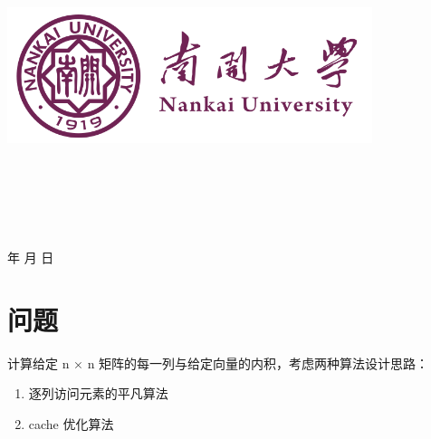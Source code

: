 \documentclass[a4paper]{article}
\newcommand{\HRule}{\rule{\linewidth}{0.5mm}}%
\begin{document}
\renewcommand{\contentsname}{目\ 录}
\renewcommand{\appendixname}{附录}
\renewcommand{\appendixpagename}{附录}
\renewcommand{\refname}{参考文献}
\renewcommand{\figurename}{图}
\renewcommand{\tablename}{表}
\renewcommand{\today}{\number\year 年 \number\month 月 \number\day 日}

\begin{titlepage}
  \begin{center}
    \includegraphics[width=0.8\textwidth]{NKU.png}\\[1cm]
    \vspace{20mm}
    \textbf{\huge\textbf{}}\\[0.5cm]
    \textbf{\huge{}}\\[2.3cm]
    \textbf{\Huge\textbf{}}

    \vspace{\fill}

    \centering
    \textsc{\LARGE {}}\\[0.5cm]
    \textsc{\LARGE {}}\\[0.5cm]
    \textsc{\LARGE {}}\\[0.5cm]

    \vfill
    {\Large \today}
  \end{center}
\end{titlepage}

\renewcommand {\thefigure}{\thesection{}.\arabic{figure}}%
\renewcommand{\figurename}{图}
\renewcommand{\contentsname}{目录}


\clearpage
\tableofcontents
\newpage

\section{问题}
计算给定 n × n 矩阵的每一列与给定向量的内积，考虑两种算法设计思路：
\begin{enumerate}
  \item 逐列访问元素的平凡算法
  \item cache 优化算法
\end{enumerate}
\end{document}
